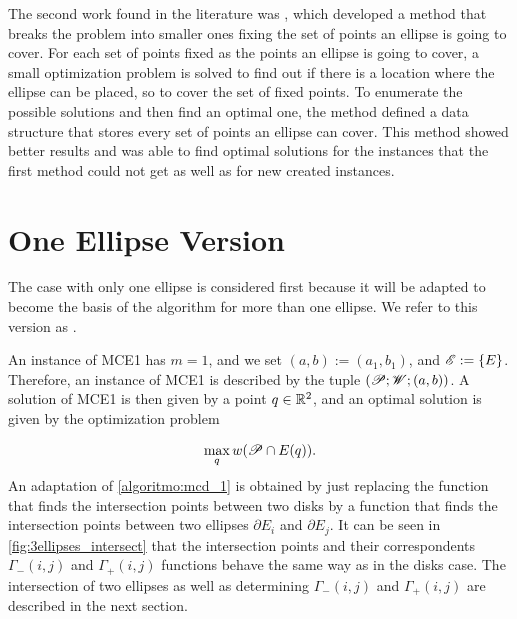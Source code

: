 The second work found in the literature was , which developed a method that breaks the problem into smaller ones fixing the set of points an ellipse is going to cover. For each set of points fixed as the points an ellipse is going to cover, a small optimization problem is solved to find out if there is a location where the ellipse can be placed, so to cover the set of fixed points. To enumerate the possible solutions and then find an optimal one, the method defined a data structure that stores every set of points an ellipse can cover. This method showed better results and was able to find optimal solutions for the instances that the first method could not get as well as for new created instances.

\section{One Ellipse Version}

The case with only one ellipse is considered first because it will be adapted to become the basis of the algorithm for more than one ellipse. We refer to this version as . 

An instance of MCE1 has $m=1$, and we set $(a, b):=(a_1, b_1)$, and $\mathscr{E} := \{E\}$. Therefore, an instance of MCE1 is described by the tuple $(\mathscr{P}; \mathscr{W}; (a, b))$. A solution of MCE1 is then given by a point $q\in\mathbb{R}^2$, and an optimal solution is given by the optimization problem

\begin{equation*}
\max_q w(\mathscr{P} \cap E(q)).
\end{equation*}
An adaptation of \autoref{algoritmo:mcd_1} is obtained by just replacing the function that finds the intersection points between two disks by a function that finds the intersection points between two ellipses $\partial E_i$ and $\partial E_j$.
It can be seen in \autoref{fig:3ellipses_intersect} that the intersection points and their correspondents $\Gamma_-(i,j)$ and $\Gamma_+(i,j)$ functions behave the same way as in the disks case.
The intersection of two ellipses as well as determining $\Gamma_-(i,j)$ and $\Gamma_+(i,j)$ are described in the next section.


